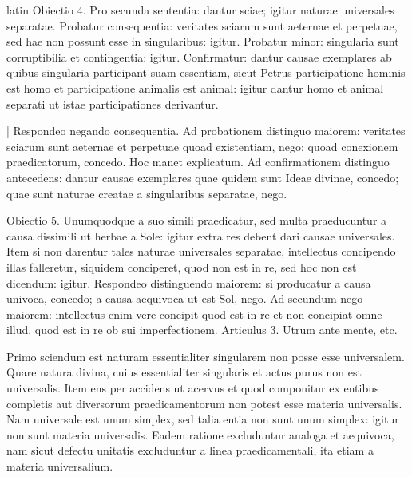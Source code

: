 \begin{otherlanguage*}{latin}
\pstart
 Obiectio 4. Pro secunda sententia: dantur sciae; igitur naturae universales separatae. Probatur consequentia: veritates sciarum sunt aeternae et perpetuae, sed hae non possunt esse in singularibus: igitur. Probatur minor: singularia sunt corruptibilia et contingentia: igitur. Confirmatur: dantur causae exemplares ab quibus singularia participant suam essentiam, sicut Petrus participatione hominis est homo et participatione animalis est animal: igitur dantur homo et animal separati ut istae participationes derivantur. 
\pend

\pstart
 \textnormal{|} Respondeo negando consequentia. Ad probationem distinguo maiorem: veritates sciarum sunt aeternae et perpetuae quoad existentiam, nego: quoad conexionem praedicatorum, concedo. Hoc manet explicatum. Ad confirmationem distinguo antecedens: dantur causae exemplares quae quidem sunt Ideae divinae, concedo; quae sunt naturae creatae a singularibus separatae, nego. 
\pend

\pstart
 Obiectio 5. Unumquodque a suo simili praedicatur, sed multa praeducuntur a causa dissimili ut herbae a Sole: igitur extra res debent dari causae universales. Item si non darentur tales naturae universales separatae, intellectus concipendo illas falleretur, siquidem conciperet, quod non est in re, sed hoc non est dicendum: igitur. Respondeo distinguendo maiorem: si producatur a causa univoca, concedo; a causa aequivoca ut est Sol, nego. Ad secundum nego maiorem: intellectus enim vere concipit quod est in re et non concipiat omne illud, quod est in re ob sui imperfectionem. Articulus 3. Utrum ante mente, etc. 
\pend

        \pstart
        \pend
      
\pstart
 Primo sciendum est naturam essentialiter singularem non posse esse universalem. Quare natura divina, cuius essentialiter singularis et actus purus non est universalis. Item ens per accidens ut acervus et quod componitur ex entibus completis aut diversorum praedicamentorum non potest esse materia universalis. Nam universale est unum simplex, sed talia entia non sunt unum simplex: igitur non sunt materia universalis. Eadem ratione excluduntur analoga et aequivoca, nam sicut defectu unitatis excluduntur a linea praedicamentali, ita etiam a materia universalium. 
\pend


\end{otherlanguage*}
